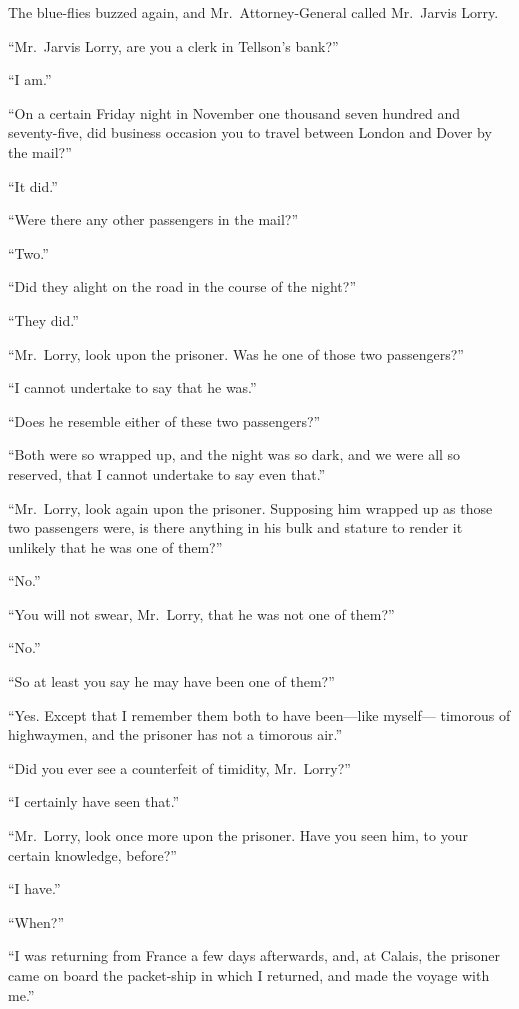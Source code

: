 The blue-flies buzzed again, and Mr.\ Attorney-General called Mr.\ Jarvis Lorry.

``Mr.\ Jarvis Lorry, are you a clerk in Tellson's bank?''

``I am.''

``On a certain Friday night in November one thousand seven hundred and
seventy-five, did business occasion you to travel between London and
Dover by the mail?''

``It did.''

``Were there any other passengers in the mail?''

``Two.''

``Did they alight on the road in the course of the night?''

``They did.''

``Mr.\ Lorry, look upon the prisoner.  Was he one of those two passengers?''

``I cannot undertake to say that he was.''

``Does he resemble either of these two passengers?''

``Both were so wrapped up, and the night was so dark, and we were all
so reserved, that I cannot undertake to say even that.''

``Mr.\ Lorry, look again upon the prisoner.  Supposing him wrapped up
as those two passengers were, is there anything in his bulk and
stature to render it unlikely that he was one of them?''

``No.''

``You will not swear, Mr.\ Lorry, that he was not one of them?''

``No.''

``So at least you say he may have been one of them?''

``Yes.  Except that I remember them both to have been---like myself---%
timorous of highwaymen, and the prisoner has not a timorous air.''

``Did you ever see a counterfeit of timidity, Mr.\ Lorry?''

``I certainly have seen that.''

``Mr.\ Lorry, look once more upon the prisoner.  Have you seen him,
to your certain knowledge, before?''

``I have.''

``When?''

``I was returning from France a few days afterwards, and, at Calais,
the prisoner came on board the packet-ship in which I returned, and
made the voyage with me.''

